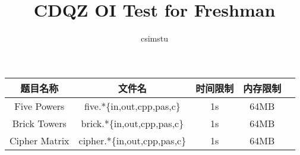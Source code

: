 \documentclass[a4paper]{article}
\begin{document}
\title{CDQZ OI Test for Freshman}
\author{csimstu}
\maketitle
\begin{center}
\begin{tabular}{|c|c|c|c|c|}
\hline
题目名称 & 文件名 & 时间限制 & 内存限制 \\ \hline
Five Powers & five.*\{in,out,cpp,pas,c\} & 1s & 64MB\\ \hline
Brick Towers & brick.*\{in,out,cpp,pas,c\} & 1s & 64MB \\ \hline
Cipher Matrix & cipher.*\{in,out,cpp,pas,c\} & 1s & 64MB \\ \hline
\end{tabular}
\end{center}
\tableofcontents




\end{document}
